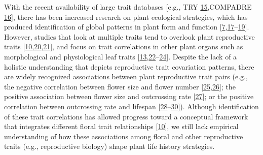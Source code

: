 \documentclass[
  12pt,
  a4paper,
]{article}
\begin{document}
With the recent availability of large trait databases {[}e.g., TRY \protect\hyperlink{ref-kattge2011}{15},COMPADRE \protect\hyperlink{ref-salguero2015}{16}{]}, there has been increased research on plant ecological strategies, which has produced identification of global patterns in plant form and function {[}\protect\hyperlink{ref-salguero2016}{7},\protect\hyperlink{ref-diaz2016}{17}--\protect\hyperlink{ref-carmona2021}{19}{]}. However, studies that look at multiple traits tend to overlook plant reproductive traits {[}\protect\hyperlink{ref-roddy2021}{10},\protect\hyperlink{ref-evojtko2020}{20},\protect\hyperlink{ref-ruger2018}{21}{]}, and focus on trait correlations in other plant organs such as morphological and physiological leaf traits {[}\protect\hyperlink{ref-wright2004}{13},\protect\hyperlink{ref-shipley2006}{22}--\protect\hyperlink{ref-osnas2013}{24}{]}. Despite the lack of a holistic understanding that depicts reproductive trait covariation patterns, there are widely recognized associations between plant reproductive trait pairs (e.g., the negative correlation between flower size and flower number {[}\protect\hyperlink{ref-sargent2007}{25},\protect\hyperlink{ref-kettle2011}{26}{]}; the positive association between flower size and outcrossing rate {[}\protect\hyperlink{ref-goodwillie2010}{27}{]}; or the positive correlation between outcrossing rate and lifespan {[}\protect\hyperlink{ref-barrett2003}{28}--\protect\hyperlink{ref-moeller2017}{30}{]}). Although identification of these trait correlations has allowed progress toward a conceptual framework that integrates different floral trait relationships {[}\protect\hyperlink{ref-roddy2021}{10}{]}, we still lack empirical understanding of how these associations among floral and other reproductive traits (e.g., reproductive biology) shape plant life history strategies.
\end{document}
